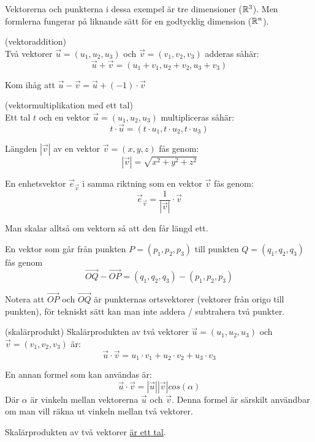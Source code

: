 \documentclass[../main.tex]{subfiles}
\begin{document}
Vektorerna och punkterna i dessa exempel är tre dimensioner ($\mathbb{R}^{3}$). Men formlerna fungerar på liknande sätt för en godtycklig dimension ($\mathbb{R}^{n}$).

\begin{formel}{(vektoraddition)}\\
\label{vecadd}
Två vektorer $\vec{u} = (u_1, u_2, u_3)$ och $\vec{v} = (v_1, v_2, v_3)$ adderas såhär:
\[
\vec{u} + \vec{v} = (u_1 + v_1, u_2 + v_2, u_3 + v_3)
\]

Kom ihåg att $\vec{u} - \vec{v} = \vec{u} + (-1)\cdot\vec{v}$
\end{formel}


\begin{formel}{(vektormultiplikation med ett tal)}\\
\label{vecscale}
Ett tal $t$ och en vektor $\vec{u} = (u_1, u_2, u_3)$ multipliceras såhär:
\[
t \cdot \vec{u} = (t \cdot u_1, t \cdot u_2, t \cdot u_3)
\]
\end{formel}



\begin{formel}
\label{veclength}
Längden $|\vec{v}|$ av en vektor $\vec{v} = (x, y, z)$ fås genom:
\[
|\vec{v}| = \sqrt{x^2+y^2+z^2}
\]

\end{formel}


\begin{formel}
\label{unitvec}
En enhetsvektor $\vec{e}_\vec{v}$ i samma riktning som en vektor $\vec{v}$ fås genom:
\[
    \vec{e}_{\vec{v}} = \frac{1}{|\vec{v}|} \cdot \vec{v} 
\]

Man skalar alltså om vektorn så att den får längd ett.
\end{formel}


\begin{formel}
\label{vecbetweendots}
En vektor som går från punkten $P = (p_1, p_2, p_3)$ till punkten $Q = (q_1, q_2, q_3)$ fås genom
$$\vec{OQ} - \vec{OP} = (q_1, q_2, q_3) - (p_1, p_2, p_3)$$

Notera att $\vec{OP}$ och $\vec{OQ}$ är punkternas ortsvektorer (vektorer från origo till punkten), för tekniskt sätt kan man inte addera / subtrahera två punkter.
\end{formel}


\begin{formel}{(skalärprodukt)}
\label{skalarprod}
Skalärprodukten av två vektorer $\vec{u} = (u_1, u_2, u_3)$ och $\vec{v} = (v_1, v_2, v_3)$ är:
\[
\vec{u} \cdot \vec{v} = u_1 \cdot v_1 + u_2 \cdot v_2 + u_3 \cdot v_3
\]

En annan formel som kan användas är: 
\[
\vec{u} \cdot \vec{v} = |\vec{u}||\vec{v}|cos(\alpha)
\]
Där $\alpha$ är vinkeln mellan vektorerna $\vec{u}$ och $\vec{v}$. Denna formel är särskilt användbar om man vill räkna ut vinkeln mellan två vektorer.

Skalärprodukten av två vektorer \underline{är ett tal}.
\end{formel}
\end{document}
